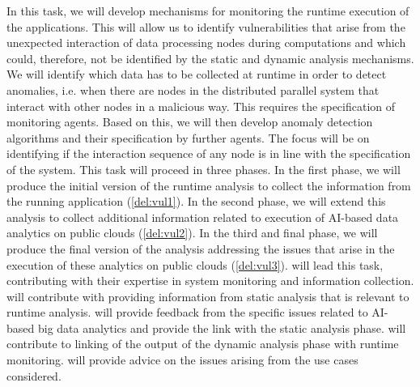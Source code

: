 \begin{Workpackage}{\thewpno}
\begin{Task}
\TaskResults{%
\ref{del:vul1},
\ref{del:vul2},
\ref{del:vul3}
}
\TaskHeader{}
In this task, we will develop mechanisms for monitoring the runtime execution of the applications. This will allow us to identify vulnerabilities that arise from the unexpected interaction of data processing nodes during computations and which could, therefore, not be identified by the static and dynamic analysis mechanisms. We will identify which data has to be collected at runtime in order to detect anomalies, i.e. when there are nodes in the distributed parallel system that interact with other nodes in a malicious way. This requires the specification of monitoring agents. Based on this, we will then develop anomaly detection algorithms and their specification by further agents. The focus will be on identifying if the interaction sequence of any node is in line with the specification of the system. This task will proceed in three phases. In the first phase, we will produce the initial version of the runtime analysis to collect the information from the running application (\ref{del:vul1}). In the second phase, we will extend this analysis to collect additional information related to execution of AI-based data analytics on public clouds (\ref{del:vul2}). In the third and final phase, we will produce the final version of the analysis addressing the issues that arise in the execution of these analytics on public clouds (\ref{del:vul3}). \SCCHshort{} will lead this task, contributing with their expertise in system monitoring and information collection. \YAGshort{} will contribute with providing information from static analysis that is relevant to runtime analysis. \UODshort{} will provide feedback from the specific issues related to AI-based big data analytics and provide the link with the static analysis phase. \IBMshort{} will contribute to linking of the output of the dynamic analysis phase with runtime monitoring. \SOPRAshort{} will provide advice on the issues arising from the use cases considered. 
\end{Task}

\begin{Task}
\TaskResults{%
\ref{del:vul1},
\ref{del:vul2},
\ref{del:vul3}
}
\TaskHeader{}


\end{Task}
\end{Workpackage}
